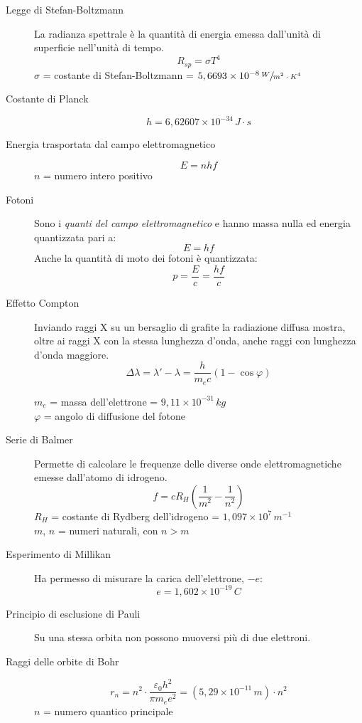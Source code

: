 \documentclass[a4paper,11pt,italian]{article}
\begin{document}
\begin{description}
  \item[Legge di Stefan-Boltzmann] 
  La radianza spettrale è la quantità di energia emessa dall'unità di superficie nell'unità di tempo.
  \[ R_{sp} = \sigma T^4 \]
  $ \sigma $ = costante di Stefan-Boltzmann = $ 5,6693 \times 10^{-8} \, \sfrac{W}{m^2 \cdot K^4} $
  
  \item[Costante di Planck]
  \[ h = 6,62607 \times 10^{-34} \, J\cdot s \]
  
  \item[Energia trasportata dal campo elettromagnetico]
  \[ E=nhf \]
  $ n $ = numero intero positivo
  
  \item[Fotoni] 
  Sono i \emph{quanti del campo elettromagnetico} e hanno massa nulla ed energia quantizzata pari a:
  \[ E=hf \]
  Anche la quantità di moto dei fotoni è quantizzata:
  \[ p = \frac{E}{c} = \frac{hf}{c} \]
  
  \item[Effetto Compton] 
  Inviando raggi X su un bersaglio di grafite la radiazione diffusa mostra, oltre ai raggi X con la stessa lunghezza d'onda, anche raggi con lunghezza d'onda maggiore.
  \[ \Delta \lambda = \lambda' - \lambda = \frac{h}{m_e c} (1 - \cos \varphi) \]
  \begin{multicols}{2}
  $ m_e $ = massa dell'elettrone = $ 9,11 \times 10^{-31} \, kg $\\
  $ \varphi  $ = angolo di diffusione del fotone
  \end{multicols}
  
  \item[Serie di Balmer] 
  Permette di calcolare le frequenze delle diverse onde elettromagnetiche emesse dall'atomo di idrogeno.
  \[ f = c R_H \left( \frac{1}{m^2} - \frac{1}{n^2} \right) \]
  $ R_H $ = costante di Rydberg dell'idrogeno = $ 1,097 \times 10^7 \, m^{-1}$\\
  $ m $, $ n $ = numeri naturali, con $ n>m $
  
  \item[Esperimento di Millikan] 
  Ha permesso di misurare la carica dell'elettrone, $ -e $:
  \[ e = 1,602 \times 10^{-19} \, C \]
  
  \item[Principio di esclusione di Pauli] 
  Su una stessa orbita non possono muoversi più di due elettroni.
  
  \item[Raggi delle orbite di Bohr]
  \[ r_n = n^2 \cdot \frac{\varepsilon_0 h^2}{\pi m_e e^2} = (5,29 \times 10^{-11} \, m)\cdot n^2 \]
  $ n $ = numero quantico principale
  

\end{description}
\end{document}
